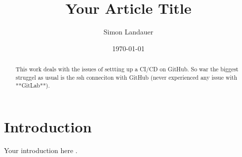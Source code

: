 \documentclass{article}
\title{Your Article Title}
\author{Simon Landauer}
\date{\today}
\begin{document}
\maketitle

\begin{abstract}
This work deals with the issues of settting up a CI/CD on GitHub. 
So war the biggest struggel as usual is the ssh conneciton with GitHub (never experienced any issue with **GitLab**).
\end{abstract}

\section{Introduction}
Your introduction here \cite{example}.



\end{document}
